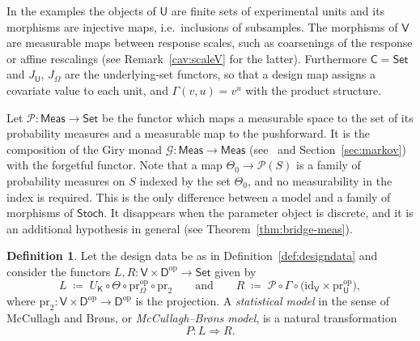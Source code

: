 \documentclass[11pt,a4paper]{article}
\theoremstyle{plain}
\theoremstyle{definition}
\newtheorem{definition}[theorem]{Definition}
\theoremstyle{remark}
\newcommand{\cat}[1]{\mathsf{#1}}
\newcommand{\catU}{\cat{U}}
\newcommand{\catV}{\cat{V}}
\newcommand{\catO}{\cat{\Omega}}
\newcommand{\catD}{\cat{D}}
\newcommand{\catK}{\cat{K}}
\newcommand{\Meas}{\cat{Meas}}
\newcommand{\Set}{\cat{Set}}
\newcommand{\Stoch}{\cat{Stoch}}
\newcommand{\G}{\mathcal{G}}
\newcommand{\Prb}{\mathcal{P}}
\newcommand{\op}{\mathrm{op}}
\newcommand{\id}{\mathrm{id}}
\newcommand{\pr}{\mathrm{pr}}
\begin{document}
In the examples the objects of $\catU$ are finite sets of experimental units
and its morphisms are injective maps, i.e.\ inclusions of subsamples. The
morphisms of $\catV$ are measurable maps between response scales, such as
coarsenings of the response or affine rescalings (see
Remark~\ref{cav:scaleV} for the latter). Furthermore $\cat{C} = \Set$ and
$J_{\catU}$, $J_{\catO}$ are the underlying-set functors, so that a design map
assigns a covariate value to each unit, and $\Gamma(v,u) = v^{u}$ with the
product structure.

Let $\Prb \colon \Meas \to \Set$ be the functor which maps a measurable space
to the set of its probability measures and a measurable map to the
pushforward. It is the composition of the Giry monad
$\G \colon \Meas \to \Meas$ (see~\cite{giry_categorical_1982} and
Section~\ref{sec:markov}) with the forgetful functor. Note that a map
$\Theta_0 \to \Prb(S)$ is a family of probability measures on $S$ indexed by
the set $\Theta_0$, and no measurability in the index is required. This is the
only difference between a model and a family of morphisms of $\Stoch$. It
disappears when the parameter object is discrete, and it is an additional
hypothesis in general (see Theorem~\ref{thm:bridge-meas}).

\begin{definition}\label{def:mcbmodel}
Let the design data be as in Definition~\ref{def:designdata} and consider the
functors $L, R \colon \catV \times \catD^{\op} \to \Set$ given by
\[
L \;\coloneqq\; U_{\catK} \circ \Theta \circ \pr_{\catO}^{\op} \circ \pr_{2}
\qquad\text{and}\qquad
R \;\coloneqq\; \Prb \circ \Gamma \circ \bigl(\id_{\catV} \times \pr_{\catU}^{\op}\bigr),
\]
where $\pr_2 \colon \catV \times \catD^{\op} \to \catD^{\op}$ is the
projection. A \emph{statistical model} in the sense of McCullagh and Br\o ns,
or \emph{McCullagh--Br\o ns model}, is a natural transformation
\[
P \colon L \Longrightarrow R.
\]
\end{definition}
\end{document}
